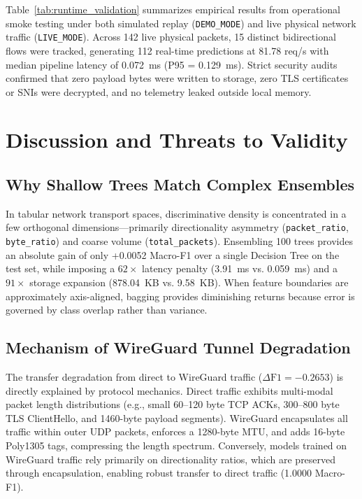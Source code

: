 \documentclass[conference]{IEEEtran}
\begin{document}
Table~\ref{tab:runtime_validation} summarizes empirical results from operational smoke testing under both simulated replay (\texttt{DEMO\_MODE}) and live physical network traffic (\texttt{LIVE\_MODE}). Across 142 live physical packets, 15 distinct bidirectional flows were tracked, generating 112 real-time predictions at 81.78 req/s with median pipeline latency of 0.072~ms (P95 = 0.129~ms). Strict security audits confirmed that zero payload bytes were written to storage, zero TLS certificates or SNIs were decrypted, and no telemetry leaked outside local memory.

\section{Discussion and Threats to Validity}
\label{sec:discussion}

\subsection{Why Shallow Trees Match Complex Ensembles}
In tabular network transport spaces, discriminative density is concentrated in a few orthogonal dimensions---primarily directionality asymmetry (\texttt{packet\_ratio}, \texttt{byte\_ratio}) and coarse volume (\texttt{total\_packets}). Ensembling 100 trees provides an absolute gain of only +0.0052 Macro-F1 over a single Decision Tree on the test set, while imposing a $62\times$ latency penalty (3.91~ms vs. 0.059~ms) and a $91\times$ storage expansion (878.04~KB vs. 9.58~KB). When feature boundaries are approximately axis-aligned, bagging provides diminishing returns because error is governed by class overlap rather than variance.

\subsection{Mechanism of WireGuard Tunnel Degradation}
The transfer degradation from direct to WireGuard traffic ($\Delta\text{F1} = -0.2653$) is directly explained by protocol mechanics. Direct traffic exhibits multi-modal packet length distributions (e.g., small 60--120 byte TCP ACKs, 300--800 byte TLS ClientHello, and 1460-byte payload segments). WireGuard encapsulates all traffic within outer UDP packets, enforces a 1280-byte MTU, and adds 16-byte Poly1305 tags, compressing the length spectrum. Conversely, models trained on WireGuard traffic rely primarily on directionality ratios, which are preserved through encapsulation, enabling robust transfer to direct traffic (1.0000 Macro-F1).
\end{document}
